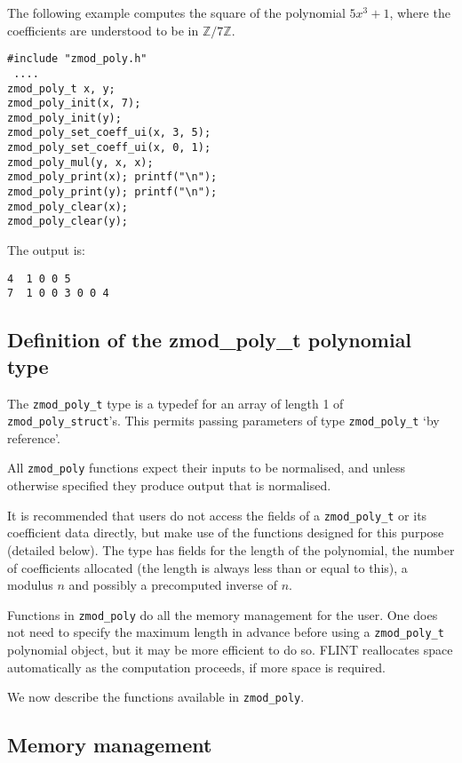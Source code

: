\documentclass[a4paper,10pt]{article}
\newcommand{\Z}{\mathbb{Z}}
\newcommand{\code}{\lstinline}
\begin{document}
The following example computes the square of the polynomial $5x^3 + 1$, where the coefficients are understood to be in $\Z/7\Z$.

\begin{lstlisting}
#include "zmod_poly.h"
 ....
zmod_poly_t x, y;
zmod_poly_init(x, 7);
zmod_poly_init(y);
zmod_poly_set_coeff_ui(x, 3, 5);
zmod_poly_set_coeff_ui(x, 0, 1);
zmod_poly_mul(y, x, x);
zmod_poly_print(x); printf("\n");
zmod_poly_print(y); printf("\n");
zmod_poly_clear(x);
zmod_poly_clear(y);
\end{lstlisting}

The output is:

\begin{lstlisting}
4  1 0 0 5
7  1 0 0 3 0 0 4
\end{lstlisting}

\subsection{Definition of the zmod\_poly\_t polynomial type}

The \code{zmod_poly_t} type is a typedef for an array of length 1 of \code{zmod_poly_struct}'s. This permits passing parameters  of type \code{zmod_poly_t} `by reference'. 

All \code{zmod_poly} functions expect their inputs to be normalised, and unless otherwise specified they produce output that is normalised. 

It is recommended that users do not access the fields of a \code{zmod_poly_t} or its coefficient data directly, but make use of the functions designed for this purpose (detailed below). The type has fields for the length of the polynomial, the number of coefficients allocated (the length is always less than or equal to this), a modulus $n$ and possibly a precomputed inverse of $n$.

Functions in \code{zmod_poly} do all the memory management for the user. One does not need to specify the maximum length in advance before using a \code{zmod_poly_t} polynomial object, but it may be more efficient to do so. FLINT reallocates space automatically as the computation proceeds, if more space is required. 

We now describe the functions available in \code{zmod_poly}.

\subsection{Memory management}
\end{document}
